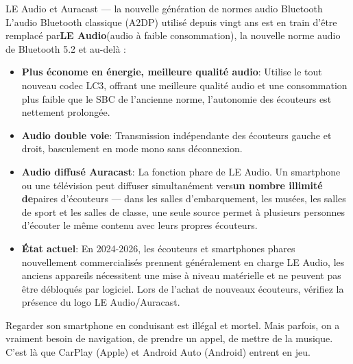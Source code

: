 \begin{tcbinfo}{LE Audio et Auracast — la nouvelle génération de normes audio Bluetooth}
L'audio Bluetooth classique (A2DP) utilisé depuis vingt ans est en train d'être remplacé par\textbf{LE Audio}(audio à faible consommation), la nouvelle norme audio de Bluetooth 5.2 et au-delà :

\begin{itemize}
  \item \textbf{Plus économe en énergie, meilleure qualité audio}: Utilise le tout nouveau codec LC3, offrant une meilleure qualité audio et une consommation plus faible que le SBC de l'ancienne norme, l'autonomie des écouteurs est nettement prolongée.
  \item \textbf{Audio double voie}: Transmission indépendante des écouteurs gauche et droit, basculement en mode mono sans déconnexion.
  \item \textbf{Audio diffusé Auracast}: La fonction phare de LE Audio. Un smartphone ou une télévision peut diffuser simultanément vers\textbf{un nombre illimité de}paires d'écouteurs — dans les salles d'embarquement, les musées, les salles de sport et les salles de classe, une seule source permet à plusieurs personnes d'écouter le même contenu avec leurs propres écouteurs.
  \item \textbf{État actuel}: En 2024-2026, les écouteurs et smartphones phares nouvellement commercialisés prennent généralement en charge LE Audio, les anciens appareils nécessitent une mise à niveau matérielle et ne peuvent pas être débloqués par logiciel. Lors de l'achat de nouveaux écouteurs, vérifiez la présence du logo LE Audio/Auracast.
\end{itemize}

\end{tcbinfo}


Regarder son smartphone en conduisant est illégal et mortel. Mais parfois, on a vraiment besoin de navigation, de prendre un appel, de mettre de la musique. C'est là que CarPlay (Apple) et Android Auto (Android) entrent en jeu.

